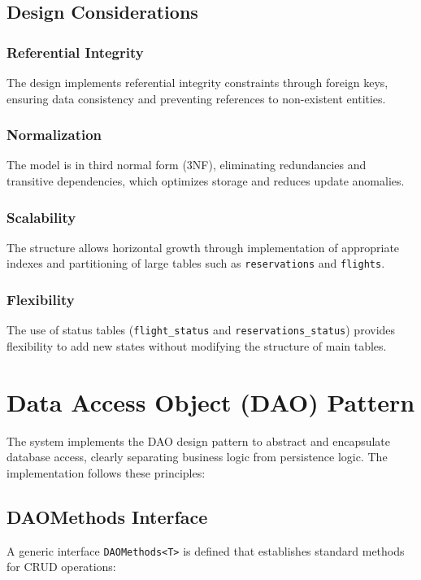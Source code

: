 \documentclass[conference]{IEEEtran}
\begin{document}
    \subsection{Design Considerations}

    \subsubsection{Referential Integrity}
    The design implements referential integrity constraints through foreign keys, ensuring data consistency and preventing references to non-existent entities.

    \subsubsection{Normalization}
    The model is in third normal form (3NF), eliminating redundancies and transitive dependencies, which optimizes storage and reduces update anomalies.

    \subsubsection{Scalability}
    The structure allows horizontal growth through implementation of appropriate indexes and partitioning of large tables such as \texttt{reservations} and \texttt{flights}.

    \subsubsection{Flexibility}
    The use of status tables (\texttt{flight\_status} and \texttt{reservations\_status}) provides flexibility to add new states without modifying the structure of main tables.

    \section{Data Access Object (DAO) Pattern}

    The system implements the DAO design pattern to abstract and encapsulate database access, clearly separating business logic from persistence logic. The implementation follows these principles:

    \subsection{DAOMethods Interface}
    A generic interface \texttt{DAOMethods<T>} is defined that establishes standard methods for CRUD operations:
\end{document}
